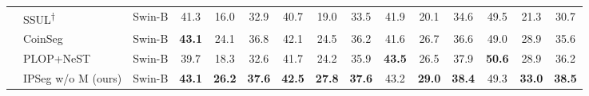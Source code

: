 \begin{table*}[t]
{\begin{tabular}{c|l|c||ccc|ccc|ccc|ccc}
    \cmidrule{2-15}
    & SSUL\textsuperscript{†}~\citep{SSUL_cha2021ssul} & Swin-B & 41.3&16.0&32.9&40.7&19.0&33.5&41.9&20.1&34.6&49.5&21.3&30.7\\
    & CoinSeg~\citep{coinseg_zhang2023coinseg} & Swin-B & \textbf{43.1}&24.1&36.8&42.1&24.5&36.2&41.6&26.7&36.6&49.0&28.9&35.6\\
    & PLOP+NeST~\citep{nest_xie2024early} & Swin-B & 39.7 & 18.3 & 32.6 & 41.7 & 24.2 & 35.9 & \textbf{43.5} & 26.5 & 37.9 & \textbf{50.6} & 28.9 & 36.2 \\
    & IPSeg w/o M (ours) & Swin-B & \textbf{43.1} & \textbf{26.2} & \textbf{37.6} & \textbf{42.5} & \textbf{27.8} & \textbf{37.6} & 43.2 & \textbf{29.0} & \textbf{38.4} & 49.3 & \textbf{33.0} & \textbf{38.5} \\

    
    


\end{tabular}}
\end{table*}
